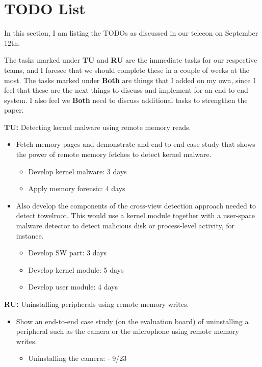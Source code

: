 \section{TODO List}

In this section, I am listing the TODOs as discussed in our telecon on
September 12th. 

The tasks marked under {\bf TU} and {\bf RU} are the immediate tasks for our
respective teams, and I foresee that we should complete these in a couple of
weeks at the most. The tasks marked under {\bf Both} are things that I added on
my own, since I feel that these are the next things to discuss and implement
for an end-to-end system. I also feel we {\bf Both} need to discuss additional
tasks to strengthen the paper.

\begin{mylist}

\item{\bf TU:} Detecting kernel malware using remote memory reads.
%
\begin{itemize}
%
\item Fetch memory pages and demonstrate and end-to-end case study that shows
the power of remote memory fetches to detect kernel malware.
\begin{itemize}
    \item Develop kernel malware: 3 days
    \item Apply memory forensic: 4 days
\end{itemize}
%
\item Also develop the components of the cross-view detection approach needed
to detect towelroot. This would use a kernel module together with a user-space
malware detector to detect malicious disk or process-level activity, for
instance.
\begin{itemize}
    \item Develop SW part: 3 days
    \item Develop kernel module: 5 days
    \item Develop user module: 4 days
\end{itemize}
%
\end{itemize}

\item{\bf RU:} Uninstalling peripherals using remote memory writes.
%
\begin{itemize}
%
\item Show an end-to-end case study (on the evaluation board) of uninstalling a
peripheral such as the camera or the microphone using remote memory writes.
\begin{itemize}
 \item Uninstalling the camera: - 9/23
\end{itemize}


\end{itemize}
\end{mylist}
